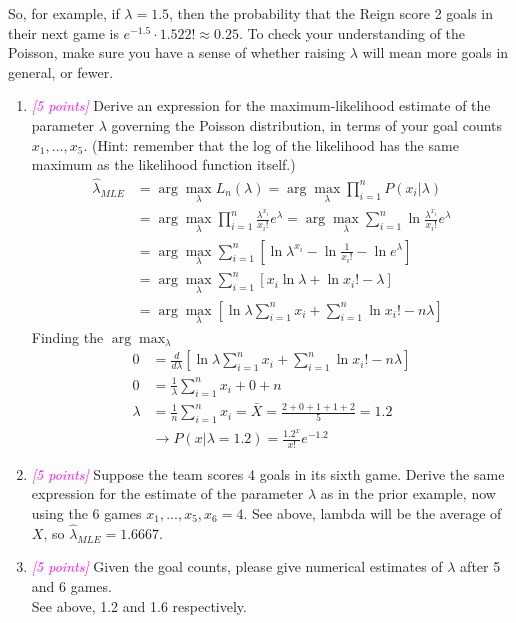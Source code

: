 \documentclass{article}
\newcommand{\argmax}{\arg\!\max}
\newcommand{\1}{\mathbf{1}}
\newcommand{\points}[1]{\small\textcolor{magenta}{\emph{[#1 points]}} \normalsize}
\begin{document}
So, for example, if $\lambda=1.5$, then the probability that the Reign score 2 goals in their next game is $e^{-1.5}\cdot1.522!\approx0.25$. To check your understanding of the Poisson, make sure you have a sense of whether raising $\lambda$ will mean more goals in general, or fewer. 
\begin{enumerate}
	\item \points{5} Derive an expression for the maximum-likelihood estimate of the parameter $\lambda$ governing the Poisson distribution, in terms of your goal counts $x_1,...,x_5$. (Hint: remember that the log of the likelihood has the same maximum as the likelihood function itself.) \newline
	\begin{align*}
	    \widehat \lambda_{MLE} &= \argmax_\lambda L_n(\lambda) = \argmax_\lambda \prod_{i=1}^n P(x_i|\lambda) \\
	    &= \argmax_\lambda\prod_{i=1}^n \frac{\lambda^{x_i}}{x_i!}e^\lambda = \argmax_\lambda\sum_{i=1}^n \ln{\frac{\lambda^{x_i}}{x_i!}e^\lambda} \\
	    &= \argmax_\lambda\sum_{i=1}^n \left[\ln\lambda^{x_i} - \ln\frac{1}{x_i!} - \ln e^\lambda\right] \\
	    &= \argmax_\lambda\sum_{i=1}^n \left[x_i\ln\lambda + \ln x_i! - \lambda\right] \\
	    &= \argmax_\lambda \left[\ln\lambda\sum_{i=1}^n x_i + \sum_{i=1}^n\ln x_i! - n\lambda\right]
	\end{align*}
	Finding the $\argmax_\lambda$ 
	\begin{align*}
	    0 &= \frac{d}{d\lambda} \left[\ln\lambda\sum_{i=1}^n x_i + \sum_{i=1}^n\ln x_i! - n\lambda\right] \\
	    0 &= \frac{1}{\lambda}\sum_{i=1}^n x_i + 0 + n \\
	    \lambda &= \frac{1}{n}\sum_{i=1}^n x_i = \bar X = \frac{2+0+1+1+2}{5} = 1.2 \\
	    &\rightarrow P(x|\lambda=1.2)=\frac{1.2^x}{x!}e^{-1.2}
	\end{align*}
	
	\item \points{5} Suppose the team scores 4 goals in its sixth game.  Derive the same expression for the estimate of the parameter $\lambda$ as in the prior example, now using the 6 games $x_1,...,x_5,x_6=4$. \newline
	See above, lambda will be the average of $X$, so $\widehat \lambda_{MLE}=1.6667$.
	
	\item\points{5} Given the goal counts, please give numerical estimates of $\lambda$ after 5 and 6 games. \\
	See above, 1.2 and 1.6 respectively.
\end{enumerate}
\end{document}
